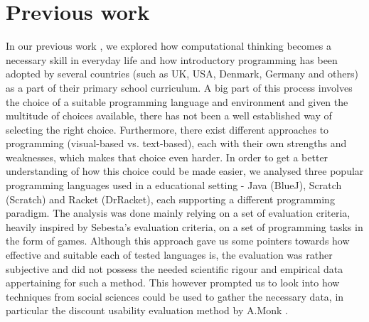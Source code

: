 \chapter{Previous work}

In our previous work \cite{SemesterProject}, we explored how computational thinking becomes a necessary skill in everyday life and how introductory programming has been adopted by several countries (such as UK, USA, Denmark, Germany and others) as a part of their primary school curriculum. A big part of this process involves the choice of a suitable programming language and environment and given the multitude of choices available, there has not been a well established way of selecting the right choice. Furthermore, there exist different approaches to programming (visual-based vs. text-based), each with their own strengths and weaknesses, which makes that choice even harder. In order to get a better understanding of how this choice could be made easier, we analysed three popular programming languages used in a educational setting - Java (BlueJ), Scratch (Scratch) and Racket (DrRacket), each supporting a different programming paradigm. The analysis was done mainly relying on a set of evaluation criteria, heavily inspired by Sebesta's evaluation criteria, on a set of programming tasks in the form of games. Although this approach gave us some pointers towards how effective and
suitable each of tested languages is, the evaluation was rather subjective and did not possess the needed scientific rigour and empirical data appertaining for such a method. This however prompted us to look into how techniques from social sciences \cite{Bryman} could be used to gather the necessary data, in particular the discount usability evaluation method by A.Monk \cite{AndrewMonk}.
